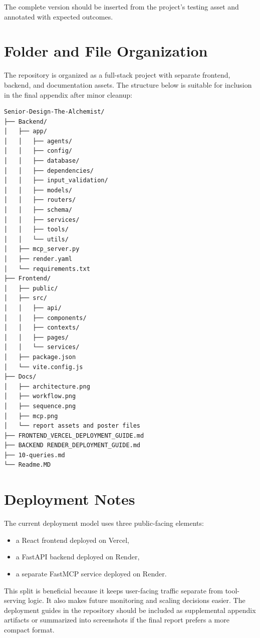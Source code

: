 \documentclass[12pt,oneside]{report}
\begin{document}
\noindent The complete version should be inserted from the project's testing asset and annotated with expected outcomes.

\section{Folder and File Organization}

The repository is organized as a full-stack project with separate frontend, backend, and documentation assets. The structure below is suitable for inclusion in the final appendix after minor cleanup:

\begin{verbatim}
Senior-Design-The-Alchemist/
├── Backend/
│   ├── app/
│   │   ├── agents/
│   │   ├── config/
│   │   ├── database/
│   │   ├── dependencies/
│   │   ├── input_validation/
│   │   ├── models/
│   │   ├── routers/
│   │   ├── schema/
│   │   ├── services/
│   │   ├── tools/
│   │   └── utils/
│   ├── mcp_server.py
│   ├── render.yaml
│   └── requirements.txt
├── Frontend/
│   ├── public/
│   ├── src/
│   │   ├── api/
│   │   ├── components/
│   │   ├── contexts/
│   │   ├── pages/
│   │   └── services/
│   ├── package.json
│   └── vite.config.js
├── Docs/
│   ├── architecture.png
│   ├── workflow.png
│   ├── sequence.png
│   ├── mcp.png
│   └── report assets and poster files
├── FRONTEND_VERCEL_DEPLOYMENT_GUIDE.md
├── BACKEND RENDER_DEPLOYMENT_GUIDE.md
├── 10-queries.md
└── Readme.MD
\end{verbatim}

\section{Deployment Notes}

The current deployment model uses three public-facing elements:
\begin{itemize}[leftmargin=0.75in]
    \item a React frontend deployed on Vercel,
    \item a FastAPI backend deployed on Render,
    \item a separate FastMCP service deployed on Render.
\end{itemize}

This split is beneficial because it keeps user-facing traffic separate from tool-serving logic. It also makes future monitoring and scaling decisions easier. The deployment guides in the repository should be included as supplemental appendix artifacts or summarized into screenshots if the final report prefers a more compact format.
\end{document}
